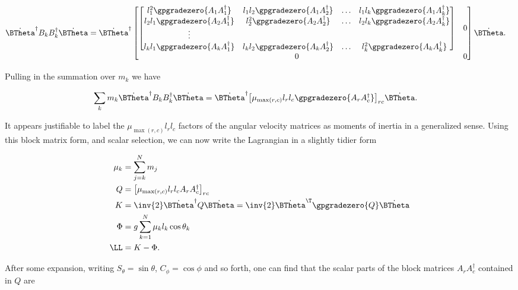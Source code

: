\begin{align}\label{eqn:sPolarArxiv:boo9}
\dot{\BTheta}^\dagger
B_k B_k^\dagger
\dot{\BTheta}
&=
\dot{\BTheta}^\dagger
\begin{bmatrix}
\begin{bmatrix}
l_1^2 \gpgradezero{A_1 A_1^\dagger} & l_1 l_2 \gpgradezero{A_1 A_2^\dagger} & \hdots & l_1 l_k \gpgradezero{A_1 A_k^\dagger} \\
l_2 l_1 \gpgradezero{A_2 A_1^\dagger} & l_2^2 \gpgradezero{A_2 A_2^\dagger} & \hdots & l_2 l_k \gpgradezero{A_2 A_k^\dagger} \\
\vdots \\
l_k l_1 \gpgradezero{A_k A_1^\dagger} & l_k l_2 \gpgradezero{A_k A_2^\dagger} & \hdots & l_k^2 \gpgradezero{A_k A_k^\dagger}
\end{bmatrix} & 0 \\
0 & 0
\end{bmatrix}
\dot{\BTheta}.
\end{align}

Pulling in the summation over $m_k$ we have

\begin{align}\label{eqn:sPolarArxiv:boo15}
\sum_k m_k
\dot{\BTheta}^\dagger
B_k B_k^\dagger
\dot{\BTheta}
&=
\dot{\BTheta}^\dagger
{\begin{bmatrix}
\mu_{\max(r,c)} l_r l_c \gpgradezero{A_r A_c^\dagger}
\end{bmatrix}}_{rc}
\dot{\BTheta}.
\end{align}

It appears justifiable to label the $\mu_{\max(r,c)} l_r l_c$ factors of the angular velocity matrices as moments of inertia in a generalized sense.  Using this block matrix form, and scalar selection, we can now write the Lagrangian in a slightly tidier form

\begin{align}\label{eqn:sPolarArxiv:boo5}
\mu_k &= \sum_{j=k}^N m_j \\
Q &= 
{\begin{bmatrix}
\mu_{\max(r,c)} l_r l_c A_r A_c^\dagger
\end{bmatrix}}_{rc} \\
K &=
\inv{2} \dot{\BTheta}^\dagger Q
\dot{\BTheta} 
=\inv{2} \dot{\BTheta}^\T \gpgradezero{Q}
\dot{\BTheta} \\
\Phi &=
g \sum_{k=1}^N \mu_k l_k \cos\theta_k \\
\LL &= K - \Phi.
\end{align}

After some expansion, writing $S_\theta = \sin\theta$, $C_\phi = \cos\phi$ and so forth, one can find that the scalar parts of the block matrices $A_r A_c^\dagger$ contained in $Q$ are


